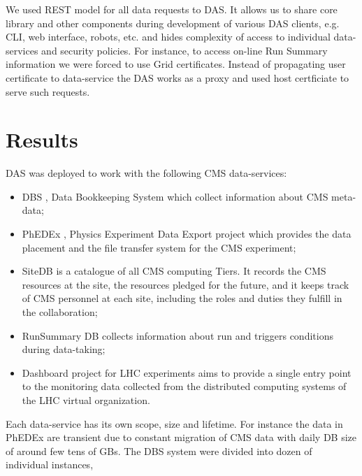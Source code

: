\documentclass[a4paper]{jpconf}
\begin{document}
We used REST model \cite{REST} for all data requests to DAS.
It allows us to share core library and other components during development of 
various DAS clients, e.g. CLI, web interface, robots, etc. and hides
complexity of access to individual data-services and security policies.
For instance, to access on-line Run Summary information we were forced to use
Grid certificates. Instead of propagating user certificate to data-service
the DAS works as a proxy and used host certficiate to serve such requests.

\section{Results\label{Results}}
DAS was deployed to work with the following CMS data-services:
\begin{itemize}
\item DBS \cite{DBS}, Data Bookkeeping System which collect information
about CMS meta-data;
\item PhEDEx \cite{PhEDEx}, Physics Experiment Data Export project which
provides the data placement and the file transfer system for the CMS experiment;
\item SiteDB \cite{SiteDB} is a catalogue of all CMS computing Tiers. 
It records the CMS resources at the site, the resources pledged for the 
future, and it keeps track of CMS personnel at each site, including the 
roles and duties they fulfill in the collaboration;
\item RunSummary DB \cite{RunSummary} collects information about run and triggers
conditions during data-taking;
\item Dashboard \cite{Dashboard} project for LHC experiments aims to 
provide a single entry point to the monitoring data collected from the 
distributed computing systems of the LHC virtual organization.
\end{itemize}
Each data-service has its own scope, size and lifetime. For instance the data
in PhEDEx are transient due to constant migration of CMS data with daily DB size of
around few tens of GBs. The DBS system were divided into dozen of individual instances, 
\end{document}
